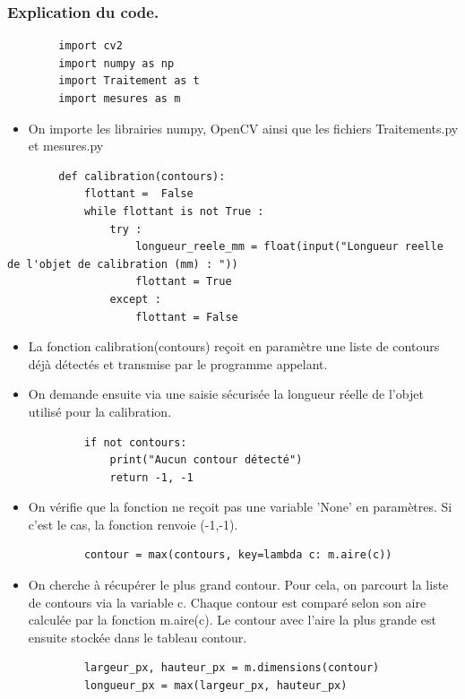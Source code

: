 \documentclass[titlepage]{article}
\begin{document}
	\subsubsection{Explication du code.}
	\begin{lstlisting}
		import cv2 
		import numpy as np
		import Traitement as t 
		import mesures as m
	\end{lstlisting}
	\begin{itemize}
		\item
		On importe les librairies numpy, OpenCV ainsi que les fichiers Traitements.py et mesures.py
	\end{itemize}
	\begin{lstlisting}
		def calibration(contours):
			flottant =  False
			while flottant is not True :
				try :
					longueur_reele_mm = float(input("Longueur reelle de l'objet de calibration (mm) : "))
					flottant = True
				except : 
					flottant = False 
	\end{lstlisting}
	\begin{itemize}
		\item
		La fonction calibration(contours) reçoit en paramètre une liste de contours déjà détectés et transmise par le programme appelant.
		\item
		On demande ensuite via une saisie sécurisée la longueur réelle de l'objet utilisé pour la calibration.
	\end{itemize}
	\begin{lstlisting}
			if not contours:
				print("Aucun contour détecté")
				return -1, -1
	\end{lstlisting}
	\begin{itemize}
		\item On vérifie que la fonction ne reçoit pas une variable 'None' en paramètres. Si c'est le cas, la fonction renvoie (-1,-1).
	\end{itemize}
	\begin{lstlisting}
			contour = max(contours, key=lambda c: m.aire(c))
	\end{lstlisting}
	\begin{itemize}
		\item On cherche à récupérer le plus grand contour. Pour cela, on parcourt la liste de contours via la variable c. Chaque contour est comparé selon son aire calculée par la fonction m.aire(c). Le contour avec l'aire la plus grande est ensuite stockée dans le tableau contour.
	\end{itemize}
	\begin{lstlisting}
			largeur_px, hauteur_px = m.dimensions(contour)
			longueur_px = max(largeur_px, hauteur_px)
	\end{lstlisting}
\end{document}

